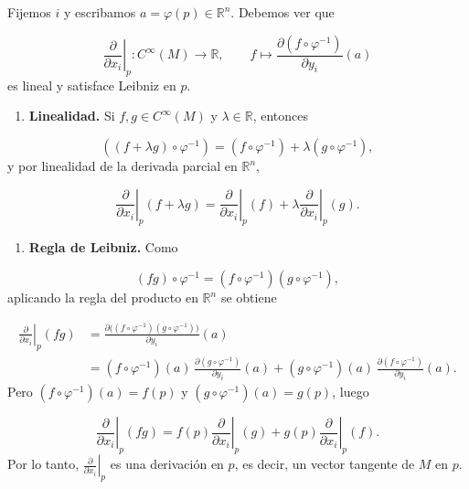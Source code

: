 \begin{bookproof}{}
Fijemos $i$ y escribamos $a=\varphi(p)\in\mathbb{R}^n$. Debemos ver que

\[
\left.\frac{\partial}{\partial x_i}\right|_p:C^\infty(M)\to\mathbb{R},\qquad
f\mapsto \frac{\partial(f\circ\varphi^{-1})}{\partial y_i}(a)
\]
es lineal y satisface Leibniz en $p$.

\begin{enumerate}
\item \textbf{Linealidad.} Si $f,g\in C^\infty(M)$ y $\lambda\in\mathbb{R}$, entonces
\end{enumerate}
\[
((f+\lambda g)\circ\varphi^{-1})=(f\circ\varphi^{-1})+\lambda(g\circ\varphi^{-1}),
\]
y por linealidad de la derivada parcial en $\mathbb{R}^n$,

\[
\left.\frac{\partial}{\partial x_i}\right|_p(f+\lambda g)
=
\left.\frac{\partial}{\partial x_i}\right|_p(f)
+
\lambda\left.\frac{\partial}{\partial x_i}\right|_p(g).
\]
\begin{enumerate}[start=2]
\item \textbf{Regla de Leibniz.} Como
\end{enumerate}
\[
(fg)\circ\varphi^{-1}=(f\circ\varphi^{-1})(g\circ\varphi^{-1}),
\]
aplicando la regla del producto en $\mathbb{R}^n$ se obtiene

\[
\begin{aligned}
\left.\frac{\partial}{\partial x_i}\right|_p(fg)
&=\frac{\partial\big((f\circ\varphi^{-1})(g\circ\varphi^{-1})\big)}{\partial y_i}(a)\\
&=(f\circ\varphi^{-1})(a)\,\frac{\partial(g\circ\varphi^{-1})}{\partial y_i}(a)
+(g\circ\varphi^{-1})(a)\,\frac{\partial(f\circ\varphi^{-1})}{\partial y_i}(a).
\end{aligned}
\]
Pero $(f\circ\varphi^{-1})(a)=f(p)$ y $(g\circ\varphi^{-1})(a)=g(p)$, luego

\[
\left.\frac{\partial}{\partial x_i}\right|_p(fg)
=
f(p)\left.\frac{\partial}{\partial x_i}\right|_p(g)
+
g(p)\left.\frac{\partial}{\partial x_i}\right|_p(f).
\]
Por lo tanto, $\left.\frac{\partial}{\partial x_i}\right|_p$ es una derivación en $p$, es decir, un vector tangente de $M$ en $p$.

\bookqed
\end{bookproof}
